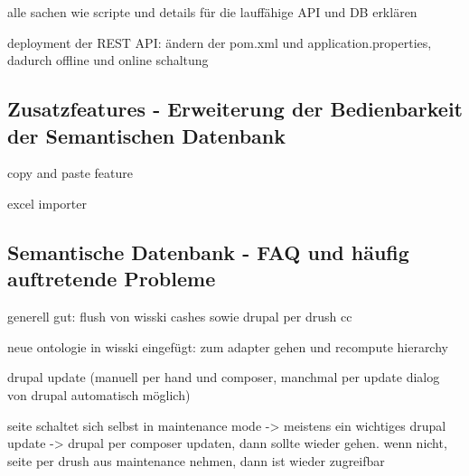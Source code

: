 alle sachen wie scripte und details für die lauffähige API und DB erklären 

deployment der REST API: ändern der pom.xml und application.properties, dadurch offline und online schaltung

\subsection{Zusatzfeatures - Erweiterung der Bedienbarkeit der Semantischen Datenbank}\label{sec:additional_features}

copy and paste feature

excel importer

\subsection{Semantische Datenbank - FAQ und häufig auftretende Probleme}\label{sec:faqSW}

generell gut: flush von wisski cashes sowie drupal per drush cc

neue ontologie in wisski eingefügt: zum adapter gehen und recompute hierarchy

drupal update (manuell per hand und composer, manchmal per update dialog von drupal automatisch möglich)

seite schaltet sich selbst in maintenance mode -> meistens ein wichtiges drupal update -> drupal per composer updaten, dann sollte wieder gehen. wenn nicht, seite per drush aus maintenance nehmen, dann ist wieder zugreifbar









